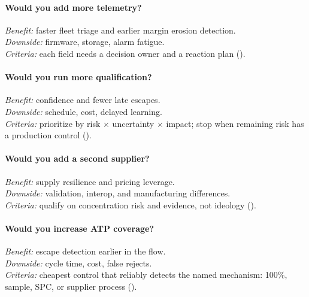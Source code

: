 \paragraph{Would you add more telemetry?}
\textit{Benefit:} faster fleet triage and earlier margin erosion detection.\\
\textit{Downside:} firmware, storage, alarm fatigue.\\
\textit{Criteria:} each field needs a decision owner and a reaction plan
().

\paragraph{Would you run more qualification?}
\textit{Benefit:} confidence and fewer late escapes.\\
\textit{Downside:} schedule, cost, delayed learning.\\
\textit{Criteria:} prioritize by risk $\times$ uncertainty $\times$ impact; stop
when remaining risk has a production control ().

\paragraph{Would you add a second supplier?}
\textit{Benefit:} supply resilience and pricing leverage.\\
\textit{Downside:} validation, interop, and manufacturing differences.\\
\textit{Criteria:} qualify on concentration risk and evidence, not ideology
().

\paragraph{Would you increase ATP coverage?}
\textit{Benefit:} escape detection earlier in the flow.\\
\textit{Downside:} cycle time, cost, false rejects.\\
\textit{Criteria:} cheapest control that reliably detects the named mechanism:
100\%, sample, SPC, or supplier process ().

